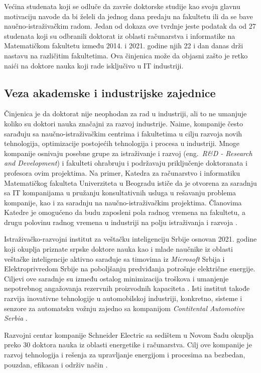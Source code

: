 \documentclass[a4paper]{article}
\begin{document}
Većina studenata koji se odluče da završe doktorske studije kao svoju glavnu motivaciju navode da bi želeli da jednog dana predaju na fakultetu ili da se bave naučno-istraživačkim radom. Jedan od dokaza ove tvrdnje jeste podatak da od 27 studenata koji su odbranili doktorat iz oblasti računarstva i informatike na Matematičkom fakultetu između 2014. i 2021. godine \cite{arhivaodbranedr, odbranedr} njih 22 i dan danas drži nastavu na različitim fakultetima. Ova činjenica može da objasni zašto je retko naići na doktore nauka koji rade isključivo u IT industriji.

\subsection{Veza akademske i industrijske zajednice}

Činjenica je da doktorat nije neophodan za rad u industriji, ali to ne umanjuje koliko su doktori nauka značajni za razvoj industrije. Naime, kompanije često sarađuju sa naučno-istraživačkim centrima i fakultetima u cilju razvoja novih tehnologija, optimizacije postojećih tehnologija i procesa u industriji. Mnoge kompanije osnivaju posebne grupe za istraživanje i razvoj (eng.~{\em R\&D - Research and Development}) i fakulteti ohrabruju i podržavaju priključenje doktoranata i profesora ovim projektima. Na primer, Katedra za računarstvo i informatiku Matematičkog fakulteta Univerziteta u Beogradu ističe da je otvorena za saradnju sa IT kompanijama u pružanju konsultativnih usluga u rešavanju problema kompanije, kao i za saradnju na naučno-istraživačkim projektima. Članovima Katedre je omogućeno da budu zaposleni pola radnog vremena na fakultetu, a drugu polovinu radnog vremena u industriji na polju istraživanja i razvoja \cite{katedra}.

Istraživačko-razvojni institut za veštačku inteligenciju Srbije osnovan 2021. godine koji okuplja priznate srpske doktore nauka kao i mlade naučnike iz oblasti veštačke inteligencije aktivno sarađuje sa timovima iz \textit{Microsoft} Srbija i Elektroprivredom Srbije na poboljšanju predviđanja potrošnje električne energije. Ciljevi ove saradnje su između ostalog minimizacija troškova i umanjenje nepotrebnog angažovanja rezervnih proizvodnih kapaciteta \cite{ivi}. Isti institut takođe razvija inovativne tehnologije u automobilskoj industriji, konkretno, sisteme i senzore za automatsku vožnju zajedno sa kompanijom \textit{Contitental Automotive Serbia} \cite{continental}.

Razvojni centar kompanije Schneider Electric sa sedištem u Novom Sadu okuplja preko 30 doktora nauka iz oblasti energetike i računarstva. Cilj ove kompanije je razvoj tehnologija i rešenja za upravljanje energijom i procesima na bezbedan, pouzdan, efikasan i održiv način \cite{schneider}.
\end{document}
